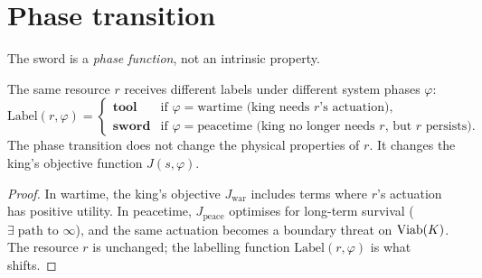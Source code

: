 \section{Phase transition}\label{sec:phase}

The sword is a \emph{phase function}, not an intrinsic property.

\begin{proposition}\label{prop:phase}
The same resource $r$ receives different labels under different system
phases $\varphi$:
\[
  \mathrm{Label}(r, \varphi) =
  \begin{cases}
    \textbf{tool} & \text{if } \varphi = \text{wartime (king needs }
    r\text{'s actuation),} \\
    \textbf{sword} & \text{if } \varphi = \text{peacetime (king no
    longer needs } r\text{, but } r \text{ persists).}
  \end{cases}
\]
The phase transition does not change the physical properties of $r$.
It changes the king's objective function $J(s, \varphi)$.
\end{proposition}

\begin{proof}
In wartime, the king's objective $J_{\mathrm{war}}$ includes terms
where $r$'s actuation has positive utility. In peacetime,
$J_{\mathrm{peace}}$ optimises for long-term survival
($\exists\;\text{path to } \infty$), and the same actuation becomes a
boundary threat on $\mathrm{Viab}(K)$. The resource $r$ is unchanged;
the labelling function $\mathrm{Label}(r, \varphi)$ is what shifts.
\end{proof}

